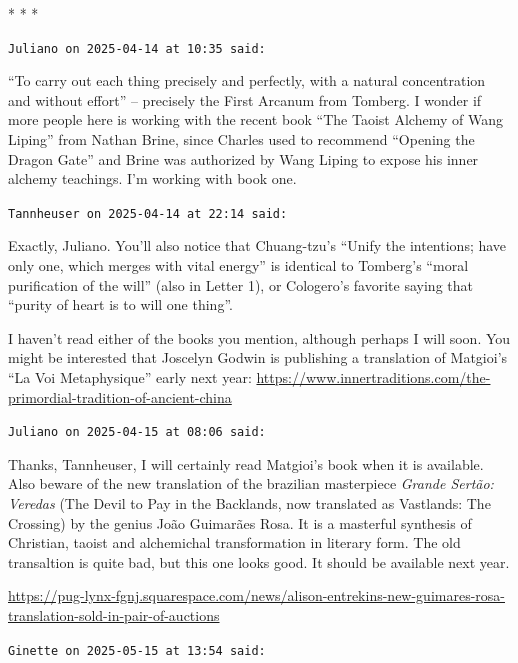 
\begin{center}* * *\end{center}

\begin{footnotesize}
\begin{sffamily}
\texttt{Juliano on 2025-04-14 at 10:35 said:}

``To carry out each thing precisely and perfectly, with a natural concentration and without effort'' -- precisely the First Arcanum from Tomberg. I wonder if more people here is working with the recent book ``The Taoist Alchemy of Wang Liping'' from Nathan Brine, since Charles used to recommend ``Opening the Dragon Gate'' and Brine was authorized by Wang Liping to expose his inner alchemy teachings. I'm working with book one.

\hfill

\texttt{Tannheuser on 2025-04-14 at 22:14 said:}

Exactly, Juliano. You'll also notice that Chuang-tzu's ``Unify the intentions; have only one, which merges with vital energy'' is identical to Tomberg's ``moral purification of the will'' (also in Letter 1), or Cologero's favorite saying that ``purity of heart is to will one thing''.

I haven't read either of the books you mention, although perhaps I will soon. You might be interested that Joscelyn Godwin is publishing a translation of Matgioi's ``La Voi Metaphysique'' early next year:
\url{https://www.innertraditions.com/the-primordial-tradition-of-ancient-china}


\hfill

\texttt{Juliano on 2025-04-15 at 08:06 said:}

Thanks, Tannheuser, I will certainly read Matgioi's book when it is available. Also beware of the new translation of the brazilian masterpiece \textit{Grande Sertão: Veredas} (The Devil to Pay in the Backlands, now translated as Vastlands: The Crossing) by the genius João Guimarães Rosa. It is a masterful synthesis of Christian, taoist and alchemichal transformation in literary form. The old transaltion is quite bad, but this one looks good. It should be available next year.

\url{https://pug-lynx-fgnj.squarespace.com/news/alison-entrekins-new-guimares-rosa-translation-sold-in-pair-of-auctions}


\hfill

\texttt{Ginette on 2025-05-15 at 13:54 said:}


\end{sffamily}
\end{footnotesize}
